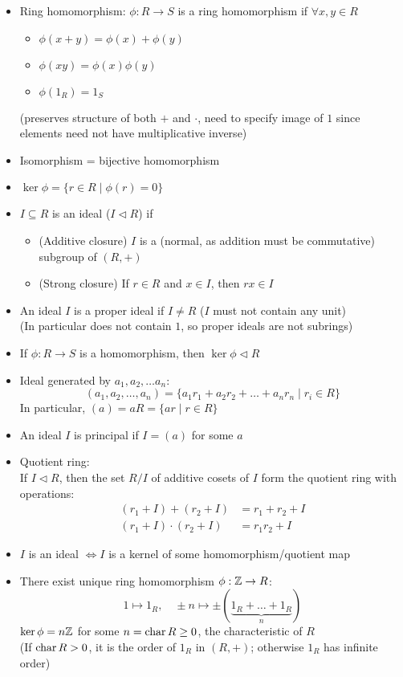 \begin{itemize}
      \item Ring homomorphism: $\phi: R \to S$ is a ring homomorphism if $\forall x,y \in R$
            \begin{itemize}
                  \item $\phi(x + y) = \phi(x) + \phi(y)$
                  \item $\phi(xy) = \phi(x)\phi(y)$
                  \item $\phi(1_R) = 1_S$
            \end{itemize} (preserves structure of both $+$ and $\cdot$, need to specify image of $1$ since elements need not have multiplicative inverse)
      \item Isomorphism = bijective homomorphism
      \item $\ker \phi = \{ r\in R \mid \phi(r) = 0\}$
      \item $I \subseteq R$ is an ideal ($I \triangleleft R$) if
            \begin{itemize}
                  \item (Additive closure) $I$ is a (normal, as addition must be commutative) subgroup of $(R,+)$
                  \item (Strong closure) If $r \in R$ and $x \in I$, then $rx \in I$
            \end{itemize}
      \item An ideal $I$ is a proper ideal if $I \neq R$  ($I$ must not contain any unit) \\
            (In particular does not contain $1$, so proper ideals are not subrings)
      \item If $\phi: R \to S$ is a homomorphism, then $\ker \phi \triangleleft R$
      \item Ideal generated by $a_1,a_2,\dots a_n$: \[(a_1,a_2,\dots, a_n) = \{a_1r_1+a_2r_2 + \dots + a_nr_n \mid r_i\in R\}\]
            In particular, $(a) = aR = \{ar \mid r \in R \}$
      \item An ideal $I$ is principal if $I = (a)$ for some $a$
      \item Quotient ring:\\
            If $I \triangleleft R$, then the set $R/I$ of additive cosets of $I$ form the quotient ring with operations:
            \begin{align*}
                  (r_1+I)+(r_2+I)       & = r_1+r_2+I \\
                  (r_1+I) \cdot (r_2+I) & = r_1r_2+I
            \end{align*}
      \item $I$ is an ideal $\iff I$ is a kernel of some homomorphism/quotient map
      \item There exist unique ring homomorphism  $\phi : \mathbb{Z} \to R$: \[1 \mapsto 1_R, \quad \pm n \mapsto \pm (\underbrace{1_R + \dots + 1_R}_{n})\]
            $\ker \phi = n\mathbb{Z}$ for some $n = \operatorname{char} R \geq 0$, the characteristic of $R$ \\
            (If $\operatorname{char} R > 0$, it is the order of $1_R$ in $(R,+)$; otherwise $1_R$ has infinite order)

\end{itemize}

